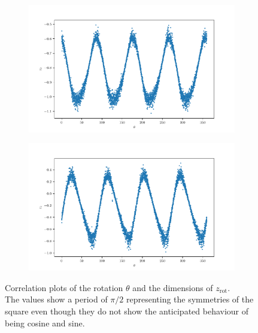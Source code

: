 \documentclass[10pt,a4paper]{article}
\newcommand{\rot}{\ensuremath{\text{rot}\xspace}}
\begin{document}
\begin{figure}[!ht]
\centering
\begin{subfigure}{0.49\textwidth}
	\centering
	\includegraphics[width=\textwidth] {square_theta_z0.pdf}
	\caption{}
	\label{fig_zo}
\end{subfigure}
\begin{subfigure}{0.49\textwidth}
	\centering	
	\includegraphics[width=\textwidth]{square_theta_z1.pdf}
	\caption{}
	\label{fig_z1}
\end{subfigure}
\caption{Correlation plots of the rotation $\theta$ and the dimensions of $z_{\rot}$.\\
The values show a period of $\pi/2$ representing the symmetries of the square even though they do not show the anticipated behaviour of being cosine and sine.} \label{Square_corr_rot}
\end{figure}
\end{document}
